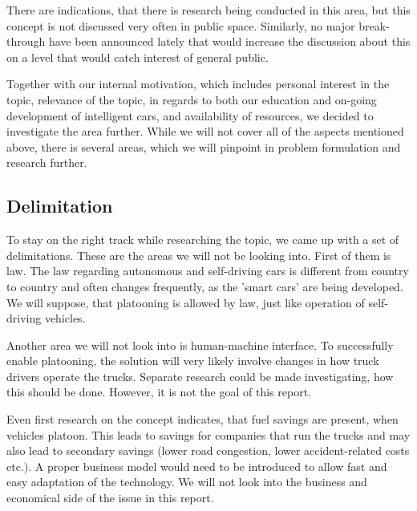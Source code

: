 % 
There are indications, that there is research being conducted in this area, but this concept is not discussed very often in public space. Similarly, no major break-through have been announced lately that would increase the discussion about this on a level that would catch interest of general public.\par
% 
Together with our internal motivation, which includes personal interest in the topic, relevance of the topic, in regards to both our education and on-going development of intelligent cars, and availability of resources, we decided to investigate the area further. While we will not cover all of the aspects mentioned above, there is several areas, which we will pinpoint in problem formulation and research further.\par
%

% 
\subsection{Delimitation}
To stay on the right track while researching the topic, we came up with a set of delimitations. These are the areas we will not be looking into. First of them is law. The law regarding autonomous and self-driving cars is different from country to country and often changes frequently, as the 'smart cars' are being developed. We will suppose, that platooning is allowed by law, just like operation of self-driving vehicles.\par
Another area we will not look into is human-machine interface. To successfully enable platooning, the solution will very likely involve changes in how truck drivers operate the trucks. Separate research could be made investigating, how this should be done. However, it is not the goal of this report.\par
Even first research on the concept indicates, that fuel savings are present, when vehicles platoon. This leads to savings for companies that run the trucks and may also lead to secondary savings (lower road congestion, lower accident-related costs etc.). A proper business model would need to be introduced to allow fast and easy adaptation of the technology. We will not look into the business and economical side of the issue in this report.
% 
